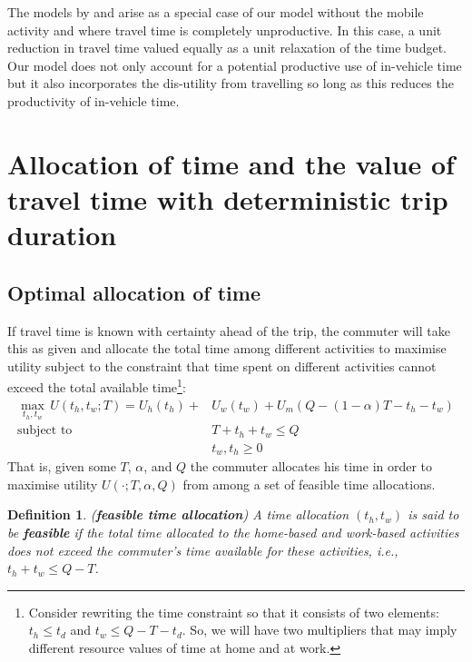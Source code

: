 \documentclass[12pt,a4paper,british]{article}
\newtheorem{definition}{Definition}[section]
\begin{document}
The models by \citeauthor{Becker1965TheoryAllocationTime} and \citeauthor{Johnson1966TravelTimePrice} arise as a special case of our model without the mobile activity and where travel time is completely unproductive. In this case, a unit reduction in travel time valued equally as a unit relaxation of the time budget.
Our model does not only account for a potential productive use of in-vehicle time but it also incorporates the dis-utility from travelling so long as this reduces the productivity of in-vehicle time.


\section{Allocation of time and the value of travel time with deterministic trip duration}

\subsection*{Optimal allocation of time}

If travel time is known with certainty ahead of the trip, the commuter will take this as given and allocate the total time among different activities to maximise utility subject to the constraint that time spent on different activities cannot exceed the total available time\footnote{Consider rewriting the time constraint so that it consists of two elements: $t_h \leq t_d$ and $t_w \leq Q-T-t_d$. So, we will have two multipliers that may imply different resource values of time at home and at work.}:
\begin{equation}
\begin{aligned}
    \max_{t_{h},t_{w}} \, U\left(t_{h},t_{w};T\right) = U_{h} \left(t_{h}\right) + & U_{w}\left(t_{w}\right) + U_{m}\left( Q - \left(1-\alpha\right) T - t_{h} - t_{w} \right) \\
    \mbox{subject to} \quad & T + t_{h} + t_{w} \leq Q \\
                      \quad & t_w, t_h \geq 0
\end{aligned}
\label{eq:maxProb_fixedT}
\end{equation}
That is, given some $T$, $\alpha$, and $Q$ the commuter allocates his time in order to maximise utility $U\left( \cdot; T, \alpha, Q \right)$ from among a set of feasible time allocations.

\begin{definition}
(\textbf{feasible time allocation}) A time allocation $\left( t_h, t_w \right)$ is said to be \textbf{\textit{feasible}} if the total time allocated to the home-based and work-based activities does not exceed the commuter's time available for these activities, i.e., $t_h + t_w \leq Q - T$.
\end{definition}
\end{document}
